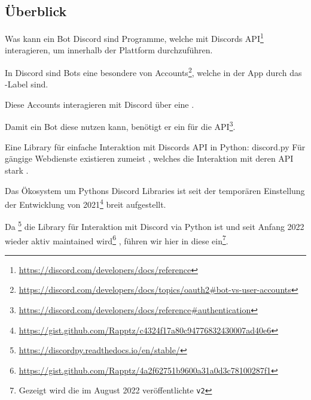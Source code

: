\documentclass[12pt, aspectratio=169, usepdftitle=false, handout]{beamer}
\newcommand{\pp}[1]{\lpl{#1}}
\newcommand{\furl}[1]{\footnote{\url{#1}}}
\begin{document}
\subsection{Überblick}

\begin{frame}{Was kann ein Bot}
        Discord  sind Programme, welche mit Discords API\furl{https://discord.com/developers/docs/reference} interagieren, um  innerhalb der Plattform durchzuführen.

		\medskip
		
		In Discord sind Bots eine besondere  von Accounts\furl{https://discord.com/developers/docs/topics/oauth2\#bot-vs-user-accounts}, welche in der App durch das \pp{BOT}-Label  sind.
		
		\medskip
		
		Diese Accounts interagieren mit Discord über eine .
		
		\medskip
		
		Damit ein Bot diese nutzen kann, benötigt er ein  für die API\furl{https://discord.com/developers/docs/reference\#authentication}.

\end{frame}

\begin{frame}{Eine Library für einfache Interaktion mit Discords API in Python: discord.py}
        Für gängige Webdienste existieren zumeist , welches die Interaktion mit\newline
         deren API stark .

		\medskip
		
		Das Ökosystem um Pythons Discord Libraries ist seit der temporären Einstellung der Entwicklung von \pp{discord.py} 2021\furl{https://gist.github.com/Rapptz/c4324f17a80c94776832430007ad40e6} 
		breit aufgestellt.
		
		\medskip
		
		Da \pp{discord.py}\furl{https://discordpy.readthedocs.io/en/stable/}
		die  Library für Interaktion mit Discord via Python ist und seit Anfang 2022 wieder aktiv maintained wird\furl{https://gist.github.com/Rapptz/4a2f62751b9600a31a0d3c78100287f1}
		, führen wir hier in diese ein\footnote{Gezeigt wird die im August 2022 veröffentlichte \texttt{v2}}.

\end{frame}

\framecardfragen
\end{document}
